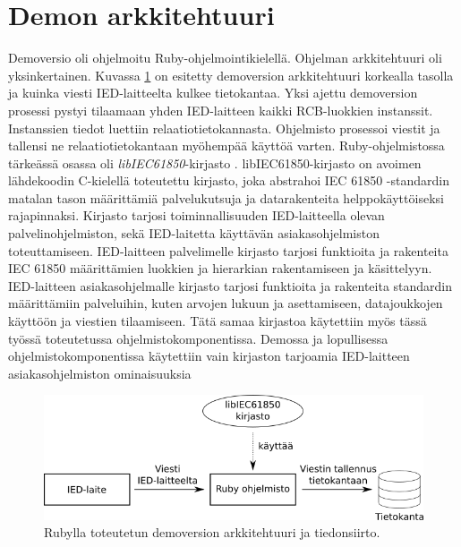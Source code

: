 \section{Demon arkkitehtuuri}
\label{ch:demoversio-ja-sen-toiminta}
Demoversio oli ohjelmoitu Ruby-ohjelmointikielellä. Ohjelman arkkitehtuuri oli yksinkertainen. Kuvassa \ref{fig:demo-architecture} on esitetty demoversion arkkitehtuuri korkealla tasolla ja kuinka viesti IED-laitteelta kulkee tietokantaa. Yksi ajettu demoversion prosessi pystyi tilaamaan yhden IED-laitteen kaikki RCB-luok\-ki\-en instanssit. Instanssien tiedot luettiin relaatiotietokannasta. Ohjelmisto prosessoi viestit ja tallensi ne relaatiotietokantaan myöhempää käyttöä varten. Ruby-ohjelmistossa tärkeässä osassa oli \emph{libIEC61850}-kirjasto \cite{libIEC61850-homepage}. libIEC61850-kirjasto on avoimen lähdekoodin C-kielellä toteutettu kirjasto, joka abstrahoi IEC 61850 -standardin matalan tason määrittämiä palvelukutsuja ja datarakenteita helppokäyttöiseksi rajapinnaksi. Kirjasto tarjosi toiminnallisuuden IED-laitteella olevan palvelinohjelmiston, sekä IED-laitetta käyttävän asiakasohjelmiston toteuttamiseen. IED-laitteen palvelimelle kirjasto tarjosi funktioita ja rakenteita IEC 61850 määrittämien luokkien ja hierarkian rakentamiseen ja käsittelyyn. IED-laitteen asiakasohjelmalle kirjasto tarjosi funktioita ja rakenteita standardin määrittämiin palveluihin, kuten arvojen lukuun ja asettamiseen, datajoukkojen käyttöön ja viestien tilaamiseen. Tätä samaa kirjastoa käytettiin myös tässä työssä toteutetussa ohjelmistokomponentissa. Demossa ja lopullisessa ohjelmistokomponentissa käytettiin vain kirjaston tarjoamia IED-laitteen asiakasohjelmiston ominaisuuksia

\begin{figure}[ht!]
	\includegraphics[width=1\textwidth]{pictures/demo-architecture.png}
	\caption{Rubylla toteutetun demoversion arkkitehtuuri ja tiedonsiirto.}
	\label{fig:demo-architecture}
\end{figure}

